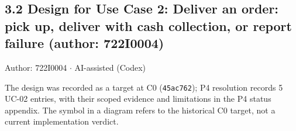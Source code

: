 \subsection*{3.2 Design for Use Case 2: Deliver an order: pick up, deliver with cash collection, or report failure (author: 722I0004)}
Author: 722I0004 \ensuremath{\cdot} AI-assisted (Codex)

The design was recorded as a target at C0 (\texttt{45ac762}); P4 resolution records 5 UC-02 entries, with their scoped evidence and limitations in the P4 status appendix. The \textdagger{} symbol in a diagram refers to the historical C0 target, not a current implementation verdict.
